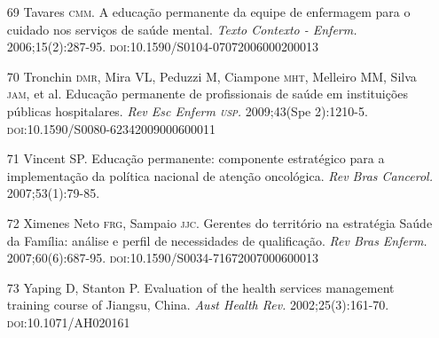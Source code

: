 \documentclass{article}
\begin{document}
\begin{itemize}
\item[69] Tavares \textsc{cmm}. A educação permanente da equipe de enfermagem para o
cuidado nos serviços de saúde mental. \textit{Texto Contexto - Enferm.}
2006;15(2):287-95. \textsc{doi}:10.1590/S0104-07072006000200013

\item[70] Tronchin \textsc{dmr}, Mira VL, Peduzzi M, Ciampone \textsc{mht}, Melleiro MM, Silva
\textsc{jam}, et al. Educação permanente de profissionais de saúde em instituições
públicas hospitalares. \textit{Rev Esc Enferm \textsc{usp}.}
2009;43(Spe 2):1210-5. \textsc{doi}:10.1590/S0080-62342009000600011

\item[71] Vincent SP. Educação permanente: componente estratégico para a
implementação da política nacional de atenção oncológica. \textit{Rev Bras
Cancerol.}
2007;53(1):79-85.

\item[72] Ximenes Neto \textsc{frg}, Sampaio \textsc{jjc}. Gerentes do território na estratégia
Saúde da Família: análise e perfil de necessidades de qualificação. \textit{Rev
Bras Enferm.}
2007;60(6):687-95. \textsc{doi}:10.1590/S0034-71672007000600013

\item[73] Yaping D, Stanton P. Evaluation of the health services management
training course of Jiangsu, China. \textit{Aust Health Rev.}
2002;25(3):161-70. \textsc{doi}:10.1071/AH020161

\end{itemize}
\end{document}
